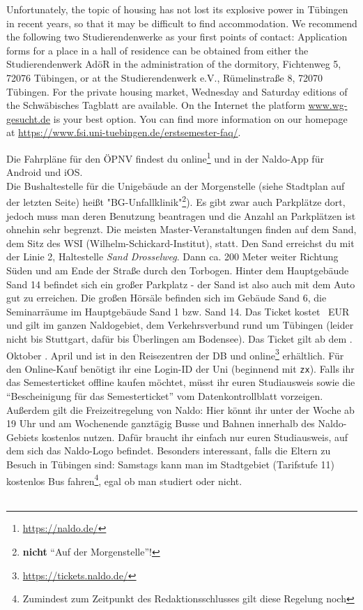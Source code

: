 Unfortunately, the topic of housing has not lost its explosive power in Tübingen in recent years,
so that it may be difficult to find accommodation. We recommend the following two Studierendenwerke as your first points of contact:
Application forms for a place in a hall of residence can be obtained from either the Studierendenwerk AdöR in the administration of the dormitory,
Fichtenweg 5, 72076 Tübingen, or at the Studierendenwerk e.V., Rümelinstraße 8, 72070 Tübingen. For the private housing market, Wednesday and Saturday
editions of the Schwäbisches Tagblatt are available.
On the Internet the platform \url{www.wg-gesucht.de} is your best option.
You can find more information on our homepage at \url{https://www.fsi.uni-tuebingen.de/erstsemester-faq/}.
\else

Die Fahrpläne für den ÖPNV  findest du online\footnote{\url{https://naldo.de/}} und in der Naldo-App für Android und iOS.\\
Die Bushaltestelle für die Unigebäude an der Morgenstelle (siehe Stadtplan auf der letzten Seite) heißt  "BG-Unfallklinik"\footnote{\textbf{nicht} "`Auf der Morgenstelle"'!}). Es gibt zwar auch Parkplätze dort, 
jedoch muss man deren Benutzung beantragen und die Anzahl an Parkplätzen ist ohnehin sehr begrenzt.
\ifmaster
Die meisten Master-Veranstaltungen finden auf dem Sand, dem Sitz des WSI (Wilhelm-Schickard-Institut), statt. Den Sand erreichst du mit der Linie 2, Haltestelle \emph{Sand Drosselweg}. Dann ca. 200 Meter weiter Richtung Süden und am Ende der Straße durch den Torbogen. Hinter dem Hauptgebäude Sand 14 befindet sich ein großer Parkplatz - der Sand ist also auch mit dem Auto gut zu erreichen. Die großen Hörsäle befinden sich im Gebäude Sand 6, die Seminarräume im Hauptgebäude Sand 1 bzw. Sand 14.
\fi
Das Ticket kostet \ticketpreis~EUR und gilt im ganzen Naldogebiet, dem Verkehrsverbund rund um Tübingen (leider nicht bis Stuttgart, dafür bis Überlingen am Bodensee). Das Ticket gilt ab dem 
. Oktober
\fi
{}. April
\fi 
und ist in den Reisezentren der DB und online\footnote{\url{https://tickets.naldo.de/}} erhältlich. Für den Online-Kauf benötigt ihr eine Login-ID der Uni (beginnend mit \texttt{zx}). Falls ihr das Semesterticket offline kaufen möchtet, müsst ihr euren Studiausweis sowie die "`Bescheinigung für das Semesterticket"' vom Datenkontrollblatt vorzeigen. \\
Außerdem gilt die Freizeitregelung von Naldo: Hier könnt ihr unter der Woche ab 19 Uhr und am Wochenende ganztägig Busse und Bahnen innerhalb des Naldo-Gebiets kostenlos nutzen. Dafür braucht ihr einfach nur euren Studiausweis, auf dem sich das Naldo-Logo befindet.
Besonders interessant, falls die Eltern zu Besuch in Tübingen sind: Samstags kann man im Stadtgebiet (Tarifstufe 11) kostenlos Bus fahren\footnote{Zumindest zum Zeitpunkt des Redaktionsschlusses gilt diese Regelung noch}, egal ob man studiert oder nicht. \\\\

